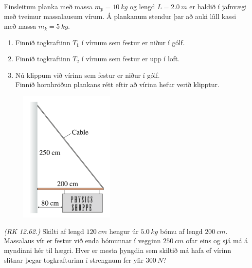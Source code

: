 \ifdefined \wholebook \else\documentclass[oneside]{book}\usepackage{EdlBook}\graphicspath{{figures/}}
\begin{document}
\begin{enumerate}[label = \textbf{Dæmi \thechapter.\arabic*.}]
\begin{minipage}{\linewidth}
\item Einsleitum planka með massa $m_p = \SI{10}{kg}$ og lengd $L = \SI{2.0}{m}$ er haldið í jafnvægi með tveimur massalausum vírum. Á plankanum stendur þar að auki líill kassi með massa $m_k = \SI{5}{kg}$.
\end{minipage}

\begin{enumerate}[label = \textbf{(\alph*)}]
    \item Finnið togkraftinn $T_1$ í vírnum sem festur er niður í gólf.
    
    \item Finnið togkraftinn $T_2$ í vírnum sem festur er upp í loft.
    
    \item Nú klippum við vírinn sem festur er niður í gólf. \\ Finnið hornhröðun plankans
    rétt eftir að vírinn hefur verið klipptur.
    
\end{enumerate}

\vspace{0.75cm}


\begin{minipage}{\linewidth}

\begin{figure}
\vspace{-0.75cm}
\includegraphics[width=1.85in]{images/vir.png}
\end{figure}

\item \textit{(RK 12.62.)} Skilti af lengd $\SI{120}{cm}$ hengur úr $\SI{5.0}{kg}$ bómu af lengd $\SI{200}{cm}$. Massalaus vír er festur við enda bómunnar í vegginn $\SI{250}{cm}$ ofar eins og sjá má á myndinni hér til hægri. Hver er mesta þyngdin sem skiltið má hafa ef vírinn slitnar þegar togkrafturinn í strengnum fer yfir $\SI{300}{N}$?


\end{minipage}
\end{enumerate}
\end{document}
